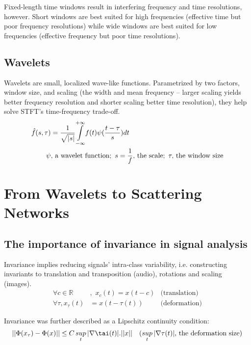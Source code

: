 \documentclass[runningheads]{llncs}
\begin{document}
Fixed-length time windows result in interfering frequency and time resolutions, however. Short windows are best suited for high frequencies (effective time but poor frequency resolutions) while wide windows are best suited for low frequencies (effective frequency but poor time resolutions).

\subsection{Wavelets}

Wavelets are small, localized wave-like functions\cite{andrew_nicoll}. Parametrized by two factors, window size, and scaling (the width and mean frequency -- larger scaling yields better frequency resolution and shorter scaling better time resolution), they help solve STFT's time-frequency trade-off.
\begin{align}
    \hat{f}(s, \tau)&=\frac{1}{\sqrt{|s|}}\underset{-\infty}{\overset{+\infty}{\int}}f(t)\psi(\frac{t-\tau}{s})dt\\
    \psi&,\,\text{a wavelet function};\,\,s=\frac{1}{f},\,\text{the scale};\,\,\tau,\,\text{the window size}\notag
\end{align}

\section{From Wavelets to Scattering Networks}

\subsection{The importance of invariance in signal analysis}

Invariance implies reducing signals' intra-class variability, i.e. constructing invariants to translation and transposition (audio), rotations and scaling (images). 
\begin{align}
    \forall c\in\mathbb{R}&,\,\,x_c(t) = x(t-c)&\text{(translation)}\\
    \forall \tau, x_\tau(t) &= x(t-\tau(t))&\text{(deformation)}
\end{align}

Invariance was further described as a Lipschitz continuity condition\cite{bruna2012invariant}\cite{mallatlecture}:
\begin{align}
    ||\Phi(x_\tau)-\Phi(x)||&\le C\,\underset{t}{sup}\,|\nabla\tai(t)|.||x||&\text{($\underset{t}{sup}\,|\nabla\tau(t)|$, the deformation size)}
\end{align}
\end{document}
